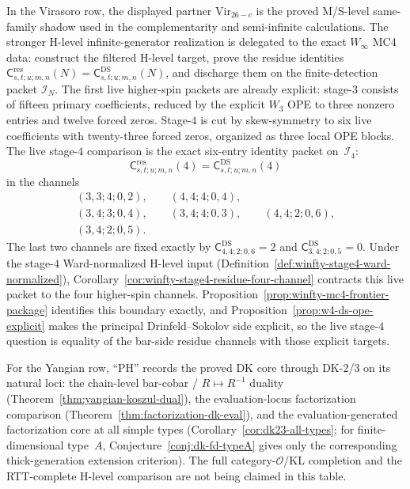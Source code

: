 In the Virasoro row, the displayed partner $\mathrm{Vir}_{26-c}$ is
the proved M/S-level same-family shadow used in the complementarity
and semi-infinite calculations. The stronger H-level
infinite-generator realization is delegated to the exact
$W_\infty$ MC4 data: construct the filtered H-level target, prove
the residue identities
$\mathsf{C}^{\mathrm{res}}_{s,t;u;m,n}(N)
=\mathsf{C}^{\mathrm{DS}}_{s,t;u;m,n}(N)$,
and discharge them on the finite-detection packet $\mathcal{I}_N$.
The first live higher-spin packets are already explicit: stage-$3$
consists of fifteen primary coefficients, reduced by the explicit
$W_3$ OPE to three nonzero entries and twelve forced zeros. Stage-$4$
is cut by skew-symmetry to six live coefficients with twenty-three
forced zeros, organized as three local OPE blocks. The live
stage-$4$ comparison is the exact six-entry identity packet
on~$\mathcal{I}_4$:
\[
\mathsf{C}^{\mathrm{res}}_{s,t;u;m,n}(4)
=
\mathsf{C}^{\mathrm{DS}}_{s,t;u;m,n}(4)
\]
in the channels
\[
\begin{gathered}
(3,3;4;0,2),\qquad
(4,4;4;0,4),\\
(3,4;3;0,4),\qquad
(3,4;4;0,3),\qquad
(4,4;2;0,6),\\
(3,4;2;0,5).
\end{gathered}
\]
The last two channels are fixed exactly by
$\mathsf{C}^{\mathrm{DS}}_{4,4;2;0,6}=2$ and
$\mathsf{C}^{\mathrm{DS}}_{3,4;2;0,5}=0$.
Under the stage-$4$ Ward-normalized H-level input
(Definition~\ref{def:winfty-stage4-ward-normalized}),
Corollary~\ref{cor:winfty-stage4-residue-four-channel} contracts this
live packet to the four higher-spin channels.
Proposition~\ref{prop:winfty-mc4-frontier-package} identifies this
boundary exactly, and
Proposition~\ref{prop:w4-ds-ope-explicit} makes the principal
Drinfeld--Sokolov side explicit, so the live stage-$4$ question is
equality of the bar-side residue channels with those explicit targets.

For the Yangian row, ``PH'' records the proved DK core through DK-2/3
on its natural loci: the chain-level bar-cobar / $R \mapsto R^{-1}$
duality
(Theorem~\ref{thm:yangian-koszul-dual}), the evaluation-locus
factorization comparison
(Theorem~\ref{thm:factorization-dk-eval}), and the
evaluation-generated factorization core at all simple types
(Corollary~\ref{cor:dk23-all-types}; for finite-dimensional
type~$A$, Conjecture~\ref{conj:dk-fd-typeA} gives only the corresponding
thick-generation extension criterion). The full
category-$\mathcal{O}$/KL completion and the RTT-complete H-level
comparison are not being claimed in this table.

